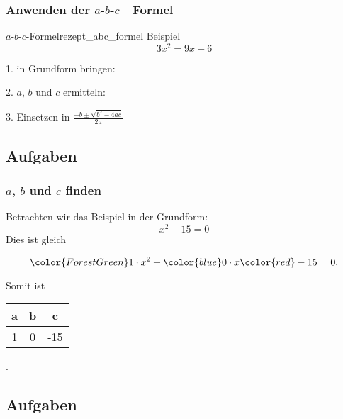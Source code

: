 {{\vspace{3cm}
}%
\newpage

\subsubsection{Anwenden der $a$-$b$-$c$---Formel}
\begin{rezept}{$a$-$b$-$c$-Formel}{rezept_abc_formel}
  Beispiel $$3x^2 = 9x - 6$$

  1. in Grundform bringen: 


2. $a$, $b$ und $c$ ermitteln:


3. Einsetzen in \large{ $\frac{-b \pm \sqrt{b^2-4ac}}{2a}$}

\end{rezept}

\subsection*{Aufgaben}
\newpage



\subsubsection{$a$, $b$ und $c$ finden}
Betrachten wir das Beispiel in der Grundform:
$$x^2 - 15 = 0$$
Dies ist gleich

$$ {\color{ForestGreen}1\cdot{}}  x^2 + {\color{blue}0\cdot{}} x{\color{red} -15} = 0.$$
  
Somit ist
\begin{tabular}{|c|c|c|}
    {\color{ForestGreen}a} & {\color{blue}b} &  {\color{red}  c} \\\hline
    {\color{ForestGreen}1} & {\color{blue}0} &  {\color{red}-15}
\end{tabular}.

\subsection*{Aufgaben}

}
